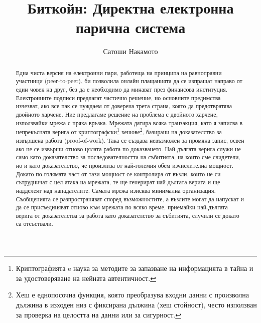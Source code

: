 \documentclass[11pt,a4paper]{article}
\title{\textbf{Биткойн: Директна електронна парична система}}
\author{Сатоши Накамото}
\date{}
\begin{document}
\maketitle

\begin{abstract}
Една чиста версия на електронни пари, работеща на принципа на равноправни участници (peer-to-peer), би позволила онлайн плащанията да се изпращат направо от един човек на друг, без да е необходимо да минават през финансова институция. Електронните подписи предлагат частично решение, но основните предимства изчезват, ако все пак се нуждаем от доверена трета страна, която да предотвратява двойното харчене. Ние предлагаме решение на проблема с двойното харчене, използвайки мрежа с пряка връзка. Мрежата датира всяка транзакция, като я записва в непрекъсната верига от криптографски\footnote{Криптографията e наука за методите за запазване на информацията в тайна и за удостоверяване на нейната автентичност.} хешове\footnote{Хеш е еднопосочна функция, която преобразува входни данни с произволна дължина в изходен низ с фиксирана дължина (хеш стойност), често използван за проверка на целостта на данни или за сигурност.}, базирани на доказателство за извършена работа (proof-of-work). Така се създава невъзможен за промяна запис, освен ако не се извърши отново цялата работа по доказването. Най-дългата верига служи не само като доказателство за последователността на събитията, на които сме свидетели, но и като доказателство, че произлиза от най-големия обем изчислителна мощност. Докато по-голямата част от тази мощност се контролира от възли, които не си сътрудничат с цел атака на мрежата, те ще генерират най-дългата верига и ще надделеят над нападателите. Самата мрежа изисква минимална организация. Съобщенията се разпространяват според възможностите, а възлите могат да напускат и да се присъединяват отново към мрежата по всяко време, приемайки най-дългата верига от доказателства за работа като доказателство за събитията, случили се докато са отсъствали.
\end{abstract}
\end{document}

